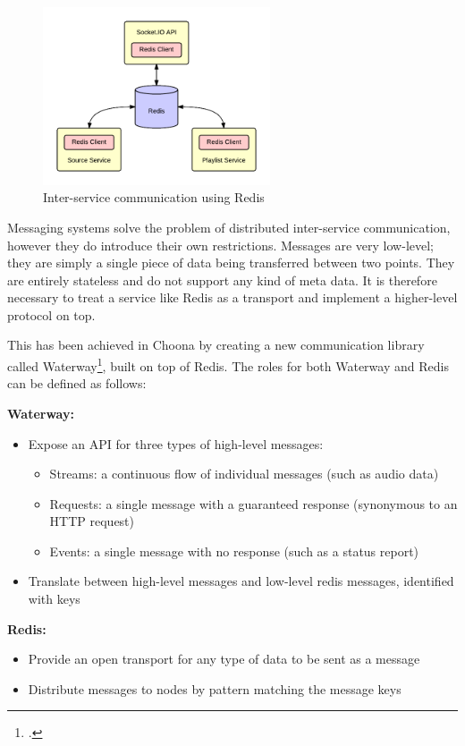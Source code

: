\begin{figure}[h!]
  \centering
  \includegraphics[width=0.6\textwidth]{./img/redis.png}
  \caption{Inter-service communication using Redis}
  \label{fig:redis-communication}
\end{figure}

Messaging systems solve the problem of distributed inter-service communication, however they do introduce their own restrictions. Messages are very low-level; they are simply a single piece of data being transferred between two points. They are entirely stateless and do not support any kind of meta data. It is therefore necessary to treat a service like Redis as a transport and implement a higher-level protocol on top.

This has been achieved in Choona by creating a new communication library called Waterway\footcite{waterway}, built on top of Redis. The roles for both Waterway and Redis can be defined as follows:

\textbf{Waterway:}
\begin{itemize}
  \item Expose an API for three types of high-level messages:
    \begin{itemize}
      \item Streams: a continuous flow of individual messages (such as audio data)
      \item Requests: a single message with a guaranteed response (synonymous to an HTTP request)
      \item Events: a single message with no response (such as a status report)
    \end{itemize}
  \item Translate between high-level messages and low-level redis messages, identified with keys
\end{itemize}

\textbf{Redis:}
\begin{itemize}
  \item Provide an open transport for any type of data to be sent as a message
  \item Distribute messages to nodes by pattern matching the message keys
\end{itemize}

